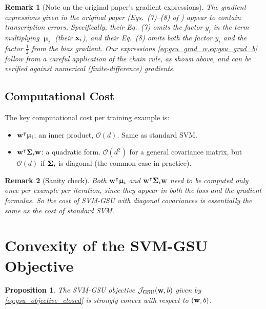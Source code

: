 \documentclass[11pt, letterpaper]{article}
\newcommand{\bSigma}{\vb{\Sigma}}
\newcommand{\bmu}{\boldsymbol{\upmu}}
\newcommand{\obj}{\mathcal{J}}
\newtheorem{proposition}[theorem]{Proposition}
\newtheorem{remark}{Remark}[section]
\begin{document}
\begin{remark}[Note on the original paper's gradient expressions]
The gradient expressions given in the original paper (Eqs.~(7)--(8) of \textcite{tzelepis2017linear}) appear to contain transcription errors. Specifically, their Eq.~(7) omits the factor $y_i$ in the term multiplying $\bmu_i$ (their $\vb{x}_i$), and their Eq.~(8) omits both the factor $y_i$ and the factor $\frac{1}{2}$ from the bias gradient. Our expressions \cref{eq:gsu_grad_w,eq:gsu_grad_b} follow from a careful application of the chain rule, as shown above, and can be verified against numerical (finite-difference) gradients.
\end{remark}

\subsection{Computational Cost}

The key computational cost per training example is:
\begin{itemize}[leftmargin=2em]
    \item $\vb{w}^{\intercal} \bmu_i$: an inner product, $\mathcal{O}(d)$. Same as standard SVM.
    \item $\vb{w}^{\intercal} \bSigma_i \vb{w}$: a quadratic form. $\mathcal{O}(d^2)$ for a general covariance matrix, but $\mathcal{O}(d)$ if $\bSigma_i$ is diagonal (the common case in practice).
\end{itemize}

\begin{remark}[Sanity check]
Both $\vb{w}^{\intercal}\bmu_i$ and $\vb{w}^{\intercal}\bSigma_i\vb{w}$ need to be computed only \emph{once} per example per iteration, since they appear in both the loss and the gradient formulas. So the cost of SVM-GSU with diagonal covariances is essentially the same as the cost of standard SVM.
\end{remark}

\section{Convexity of the SVM-GSU Objective}\label{sec:gsu_convexity}

\begin{proposition}\label{prop:gsu_convex}
The SVM-GSU objective $\obj_{\text{GSU}}(\vb{w}, b)$ given by \cref{eq:gsu_objective_closed} is strongly convex with respect to $(\vb{w}, b)$.
\end{proposition}
\end{document}
